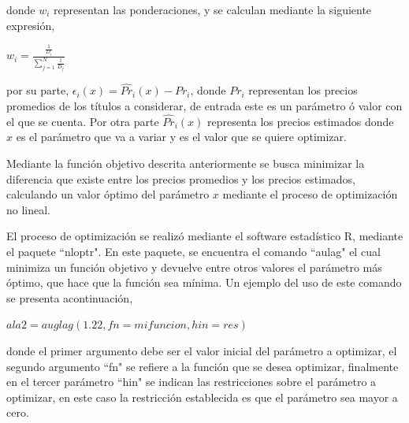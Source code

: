 \vspace{0.5cm}
\noindent donde $w_{i}$ representan las ponderaciones, y se calculan mediante la siguiente expresi\'on,\\

\begin{center}

$\displaystyle{w_{i} = \frac{\frac{1}{D_{i}}}{\sum_{j=1}^{N}\frac{1}{D_{j}}}}$

\end{center}

\vspace{0.5cm}

\noindent por su parte, $\epsilon_{i}(x)= \hat{Pr}_{i}(x)-Pr_{i}$, donde $Pr_{i}$ representan los precios promedios de los t\'itulos a considerar, de entrada este es un par\'ametro \'o valor con el que se cuenta. Por otra parte $\hat{Pr}_{i}(x)$ representa los precios estimados donde $x$ es el par\'ametro que va a variar y es el valor que se quiere optimizar.

\vspace{0.5cm}

\hspace{0.4cm} Mediante la funci\'on objetivo descrita anteriormente se busca minimizar la diferencia que existe entre los precios promedios y los precios estimados, calculando un valor \'optimo del par\'ametro $x$ mediante el proceso de optimizaci\'on no lineal.

\vspace{0.5cm}

\hspace{0.4cm}El proceso de optimizaci\'on se realiz\'o mediante el software estad\'istico R, mediante el paquete ``nloptr". En este paquete, se encuentra el comando ``aulag" el cual minimiza un funci\'on objetivo y devuelve entre otros valores el par\'ametro m\'as \'optimo, que hace que la funci\'on sea m\'inima. Un ejemplo del uso de este comando se presenta acontinuaci\'on,

\vspace{0.5cm}
\begin{center}
  $ala2=auglag(1.22, fn=mifuncion, hin=res)$
\end{center}

\vspace{0.5cm}

\noindent donde el primer argumento debe ser el valor inicial del par\'ametro a optimizar, el segundo argumento ``fn" se refiere a la funci\'on que se desea optimizar, finalmente en el tercer par\'ametro ``hin" se indican las restricciones sobre el par\'ametro a optimizar, en este caso la restricci\'on establecida es que el par\'ametro sea mayor a cero.

